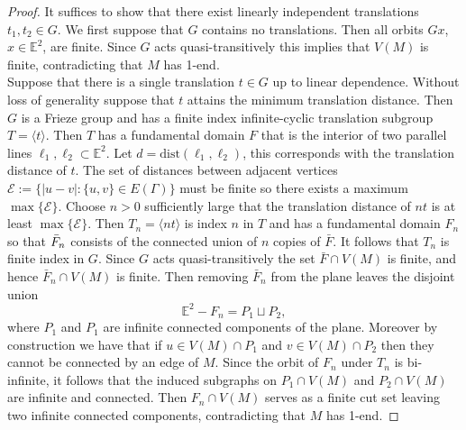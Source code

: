 \documentclass[10pt,a4paper]{amsart}
\newcommand{\EE}{\mathbb{E}}
\begin{document}
\begin{proof}
    It suffices to show that there exist linearly independent translations $t_1,t_2\in G$. We first suppose that $G$ contains no translations. Then all orbits $Gx$, $x\in\EE^2$, are finite. Since $G$ acts quasi-transitively this implies that $V(M)$ is finite, contradicting that $M$ has 1-end.\\
    Suppose that there is a single translation $t\in G$ up to linear dependence. Without loss of generality suppose that $t$ attains the minimum translation distance. Then $G$ is a Frieze group and has a finite index infinite-cyclic translation subgroup $T=\langle t\rangle$. Then $T$ has a fundamental domain $F$ that is the interior of two parallel lines $\ell_1,\ell_2\subset \EE^2$. Let $d=\text{dist}(\ell_1,\ell_2)$, this corresponds with the translation distance of $t$. 
    The set of distances between adjacent vertices $\mathcal{E}:=\{|u-v|:\{u,v\}\in E(\Gamma)\}$ must be finite so there exists a maximum $\max\{\mathcal{E}\}$.
    Choose $n>0$ sufficiently large that the translation distance of $nt$ is at least $\max\{\mathcal{E}\}$. Then $T_n=\langle nt\rangle$ is index $n$ in $T$ and has a fundamental domain $F_n$  so that $\Bar{F}_n$  consists of the connected union of $n$ copies of $\bar{F}$. It follows that $T_n$ is finite index in $G$. Since $G$ acts quasi-transitively the set $\bar{F}\cap V(M)$ is finite, and hence $\bar{F}_n\cap V(M)$ is finite. Then removing $\bar{F}_n$ from the plane leaves the disjoint union
     $$\EE^2-F_n=P_1\sqcup P_2,$$
    where $P_1$ and $P_1$ are infinite connected components of the plane. Moreover by construction we have that if $u\in V(M)\cap P_1$ and $v\in V(M)\cap P_2$ then they cannot be connected by an edge of $M$.
    Since the orbit of $F_n$ under $T_n$ is bi-infinite, it follows that the induced subgraphs on $P_1\cap V(M)$ and $P_2\cap V(M)$ are infinite and connected. Then $F_n\cap V(M)$ serves as a finite cut set leaving two infinite connected components, contradicting that $M$ has 1-end.
    \end{proof}
\end{document}
